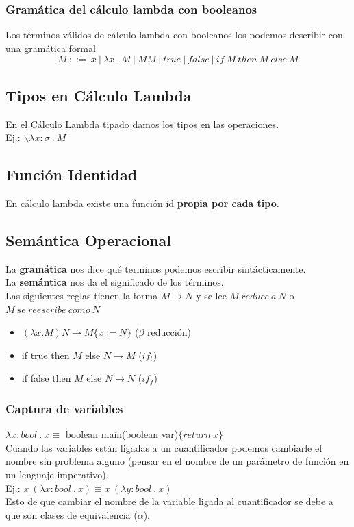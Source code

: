 \documentclass[10pt,a4paper]{article}
\begin{document}
\subsubsection*{Gramática del cálculo lambda con booleanos}
Los términos válidos de cálculo lambda con booleanos los podemos describir con una gramática formal 
\[M \ ::= \ x \ |\  \lambda x \ . \ M \ | \ MM \ | \ true \ | \ false \ | \ if \ M \ then \ M \ else \ M\] 
\subsection{Tipos en Cálculo Lambda}
En el Cálculo Lambda tipado damos los tipos en las operaciones. \\
Ej.: $\backslash \lambda x:\sigma \ . \ M$
\subsection*{Función Identidad}
En cálculo lambda existe una función id \textbf{propia por cada tipo}.
\subsection{Semántica Operacional}
La \textbf{gramática} nos dice qué terminos podemos escribir sintácticamente. \\
La \textbf{semántica} nos da el significado de los términos. \\
Las siguientes reglas tienen la forma $M \rightarrow N$ y se lee $M \ reduce \ a \ N$ o $M \ se \ reescribe \ como \ N$ \\
\begin{itemize}
    \item $(\lambda x . M) N \rightarrow M \{x := N\}$ ($\beta$ reducción)
    \item if true then $M$ else $N \rightarrow M$ ($if_{t}$)
    \item if false then $M$ else $N \rightarrow N$ ($if_{f}$)
\end{itemize}
\subsubsection{Captura de variables}
$\lambda x:bool \ . \ x \equiv $ boolean main(boolean var)$\{return \ x\}$ \\
Cuando las variables están ligadas a un cuantificador podemos cambiarle el nombre sin problema alguno (pensar en el nombre de un parámetro de función en un lenguaje imperativo). \\
Ej.: $x \ (\lambda x:bool \ . \ x) \equiv x \ (\lambda y:bool \ . \ x)$ \\
Esto de que cambiar el nombre de la variable ligada al cuantificador se debe a que son clases de equivalencia ($\alpha$).
\end{document}
